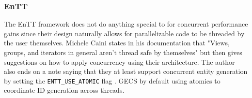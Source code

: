 \subsubsection{EnTT}
The EnTT framework does not do anything special to for concurrent performance gains since their design naturally allows for parallelizable code to be threaded by the user themselves. Michele Caini states in his documentation that "Views, groups, and iterators in general aren't thread safe by themselves" but then gives suggestions on how to apply concurrency using their architecture. The author also ends on a note saying that they at least support concurrent entity generation by setting the \texttt{ENTT\_USE\_ATOMIC} flag \cite{EnTT_multithreading}. GECS by default using atomics to coordinate ID generation across threads.